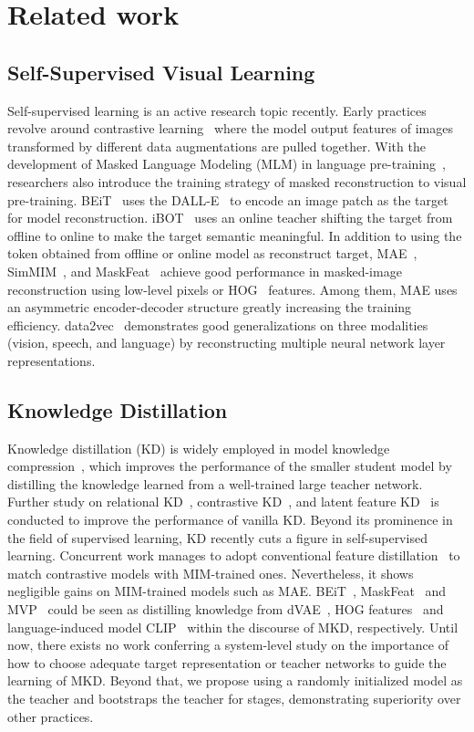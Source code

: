 \documentclass[10pt,twocolumn,letterpaper]{article}
\begin{document}
\section{Related work}
\subsection{Self-Supervised Visual Learning}
Self-supervised learning is an active research topic recently. 
Early practices revolve around contrastive learning~\cite{moco,simclr,byol,swav,dino} where 
the model output features of images transformed by different data augmentations are pulled together.
With the development of Masked Language Modeling (MLM) in language pre-training~\cite{bert}, researchers also introduce the training strategy of masked reconstruction to visual pre-training.
BEiT~\cite{beit} uses the DALL-E~\cite{dall-e} to encode an image patch as the target for model reconstruction. 
iBOT~\cite{zhou2021ibot} uses an online teacher shifting the target from offline to online to make the target semantic meaningful. 
In addition to using the token obtained from offline or online model as reconstruct target, MAE~\cite{mae}, SimMIM~\cite{xie2022simmim}, and MaskFeat~\cite{maskfeat} achieve good performance in masked-image reconstruction using low-level pixels or HOG~\cite{hog} features.
Among them, MAE uses an asymmetric encoder-decoder structure greatly increasing the training efficiency.
data2vec~\cite{baevski2022data2vec} demonstrates good generalizations on three modalities (vision, speech, and language) by reconstructing multiple neural network layer representations.

\subsection{Knowledge Distillation}
Knowledge distillation (KD) is widely employed in model knowledge compression~\cite{kd}, which improves the performance of the smaller student model by distilling the knowledge learned from a well-trained large teacher network. Further study on \eg relational KD~\cite{rkd}, contrastive KD~\cite{contrastivekd}, and latent feature KD~\cite{fitnets} is conducted to improve the performance of vanilla KD.
Beyond its prominence in the field of supervised learning, KD recently cuts a figure in self-supervised learning. 
Concurrent work manages to adopt conventional feature distillation~\cite{fd2022} to match contrastive models with MIM-trained ones. Nevertheless, it shows negligible gains on MIM-trained models such as MAE.
BEiT~\cite{beit}, MaskFeat~\cite{maskfeat} and MVP~\cite{wei2022mvp} could be seen as distilling knowledge from dVAE~\cite{dall-e}, HOG features~\cite{hog} and language-induced model CLIP~\cite{clip} within the discourse of MKD, respectively. 
Until now, there exists no work conferring a system-level study on the importance of how to choose adequate target representation or teacher networks to guide the learning of MKD.
Beyond that, we propose using a randomly initialized model as the teacher and bootstraps the teacher for stages, demonstrating superiority over other practices.
\end{document}
